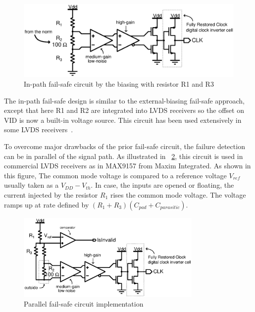 \begin{figure}[htp]
    \centering
    \includegraphics[width=\textwidth]{Chapter5/Figs/adc_chip/lvds-external-failsafe.ps}
    \caption{In-path fail-safe circuit by the biasing with resistor R1 and R3}
    \label{fig:in-path-fail-safe}
\end{figure}


The in-path fail-safe design is similar to the external-biasing fail-safe approach, except that here R1 and R2 are integrated into LVDS receivers so the offset on VID is now a built-in voltage source. This circuit has been used extensively in some LVDS receivers~\cite{TI-SLLA082B}. 

To overcome major drawbacks of the prior fail-safe circuit, the failure detection can be in parallel of the signal path. As illustrated in \figurename~\ref{fig:parallel-fail-safe}, this circuit is used in commercial LVDS receivers as in MAX9157 from Maxim Integrated. As shown in this figure, The common mode voltage is compared to a reference voltage $V_{ref}$ usually taken as a $V_{DD}-V_{th}$. In case, the inputs are opened or floating, the current injected by the resistor $R_1$ rises the common mode voltage. The voltage ramps up at rate defined by $(R_1+R_3)(C_{pad}+C_{parasitic})$.

\begin{figure}[htp]
    \centering
    \includegraphics[width=0.8\textwidth]{Chapter5/Figs/adc_chip/lvds-parallel-failsafe.ps}
    \caption{Parallel fail-safe circuit implementation}
    \label{fig:parallel-fail-safe}
\end{figure}

